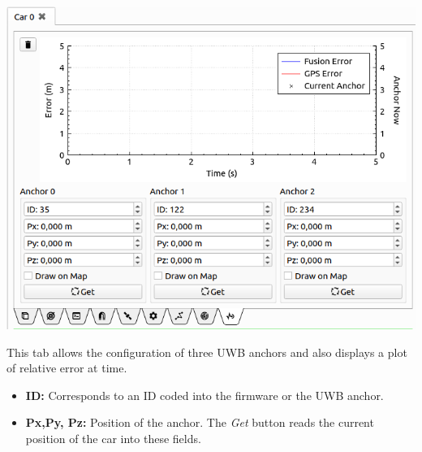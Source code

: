 \documentclass[12pt]{article} %
\def\printtodos{0}
\newcommand{\todo}[1]{
  \if\printtodos1
      {\color{red} \textbf{TODO:} #1}
  \fi}
\begin{document}
\noindent\begin{minipage}{0.5\textwidth}
  \noindent \includegraphics[width=\textwidth]{./screens/Car_UWB.png}
\end{minipage}
\begin{minipage}{0.5\textwidth} %
  This tab allows the configuration of three UWB anchors and also displays a plot
  of relative error at time.
  \begin{itemize}
  \item {\bf ID:} Corresponds to an ID coded into the firmware or the UWB anchor.
  \item {\bf Px,Py, Pz:} Position of the anchor. The {\em Get} button
    reads the current position of the car into these fields. 
  \end{itemize} 
\end{minipage}



\end{document}
